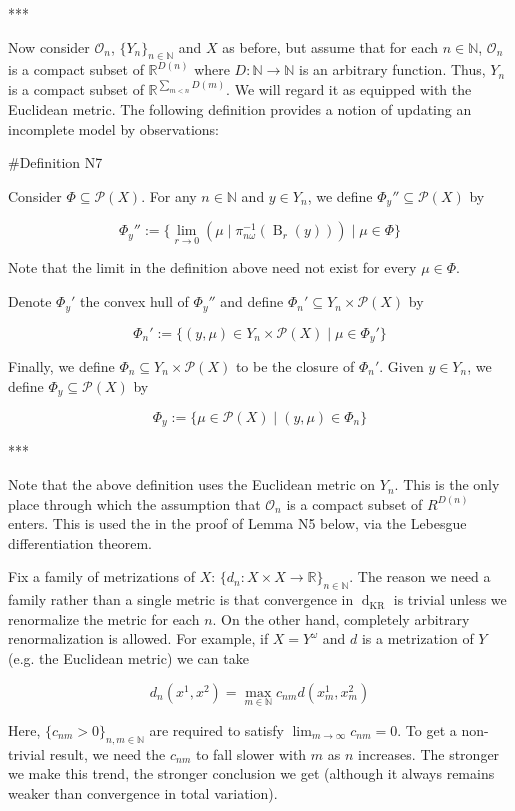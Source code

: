 \documentclass[a4paper]{article}
\newcommand{\Nats}{\mathbb{N}}
\newcommand{\Reals}{\mathbb{R}}
\newcommand{\Prob}{\mathcal{P}}
\newcommand{\Ob}{\mathcal{O}}
\newcommand{\Dkr}{\operatorname{d}_{\text{KR}}}
\newcommand{\Ball}{\operatorname{B}}
\begin{document}
***

Now consider ${\Ob_n}$, ${\{Y_n\}_{n \in \Nats}}$ and $X$ as before, but assume that for each ${n \in \Nats}$, ${\Ob_n}$ is a compact subset of ${\Reals^{D(n)}}$ where ${D: \Nats \rightarrow \Nats}$ is an arbitrary function. Thus, ${Y_n}$ is a compact subset of ${\Reals^{\sum_{m < n} D(m)}}$. We will regard it as equipped with the Euclidean metric. The following definition provides a notion of updating an incomplete model by observations:

\#Definition N7

Consider ${\Phi \subseteq \Prob(X)}$. For any ${n \in \Nats}$ and ${y \in Y_n}$, we define ${\Phi_y'' \subseteq \Prob(X)}$ by

$$\Phi_y'':=\{\lim_{r \rightarrow 0} (\mu \mid \pi_{n\omega}^{-1}(\Ball_r(y))) \mid \mu \in \Phi\}$$

Note that the limit in the definition above need not exist for every ${\mu \in \Phi}$.

Denote ${\Phi_y'}$ the convex hull of ${\Phi_y''}$ and define ${\Phi_n' \subseteq Y_n \times \Prob(X)}$ by

$$\Phi_n':=\{(y,\mu) \in Y_n \times \Prob(X) \mid \mu \in \Phi_y'\}$$

Finally, we define ${\Phi_n \subseteq Y_n \times \Prob(X)}$ to be the closure of ${\Phi_n'}$. Given ${y \in Y_n}$, we define ${\Phi_y \subseteq \Prob(X)}$ by

$$\Phi_y:=\{\mu \in \Prob(X) \mid (y,\mu) \in \Phi_n\}$$

***

Note that the above definition uses the Euclidean metric on ${Y_n}$. This is the only place through which the assumption that ${\Ob_n}$ is a compact subset of ${R^{D(n)}}$ enters. This is used the in the proof of Lemma N5 below, via the Lebesgue differentiation theorem.

Fix a family of metrizations of ${X}$: ${\{d_n: X \times X \rightarrow \Reals\}_{n \in \Nats}}$. The reason we need a family rather than a single metric is that convergence in ${\Dkr}$ is trivial unless we renormalize the metric for each ${n}$. On the other hand, completely arbitrary renormalization is allowed. For example, if ${X=Y^\omega}$ and ${d}$ is a metrization of ${Y}$ (e.g. the Euclidean metric) we can take 

$$d_n(x^1,x^2)= \max_{m \in \Nats} c_{nm} d(x^1_m,x^2_m)$$

Here, ${\{c_{nm} > 0\}_{n,m \in \Nats}}$ are required to satisfy ${\lim_{m \rightarrow \infty} c_{nm} = 0}$. To get a non-trivial result, we need the ${c_{nm}}$ to fall slower with ${m}$ as ${n}$ increases. The stronger we make this trend, the stronger conclusion we get (although it always remains weaker than convergence in total variation).
\end{document}

